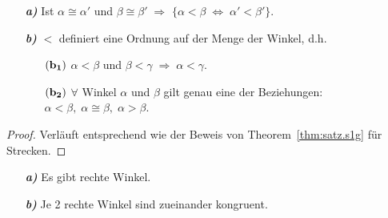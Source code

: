 \begin{thm}
\begin{enumerate}
    \item[\emph{\textbf{a)}}] Ist $\alpha\cong\alpha'$ und $\beta\cong\beta'\;\Rightarrow$
    $\{\alpha<\beta\;\Longleftrightarrow\;\alpha'<\beta'\}$.
    \item[\emph{\textbf{b)}}] \glqq{}$<$\grqq{} definiert eine Ordnung auf der
    Menge der Winkel, d.h.
    \begin{enumerate}
        \item[$\bf{(b_1)}$]  $\alpha<\beta$ und $\beta<\gamma\;\Rightarrow\;\alpha<\gamma$.
        \item[$\bf{(b_2)}$] $\forall$ Winkel $\alpha$ und $\beta$ gilt
        genau eine der Beziehungen:
        $\alpha<\beta,\;\alpha\cong\beta,\;\alpha>\beta$.
    \end{enumerate}
\end{enumerate}
\end{thm}



\begin{proof}
Verl\"{a}uft entsprechend wie der Beweis von Theorem~\ref{thm:satz.s1g}
f\"{u}r Strecken. %
\end{proof}







\begin{thm}\label{thm:satz.s1m}
\begin{enumerate}
    \item[\emph{\textbf{a)}}]Es gibt rechte Winkel.
    \item[\emph{\textbf{b)}}] Je 2 rechte Winkel sind zueinander kongruent.
\end{enumerate}
\end{thm}

